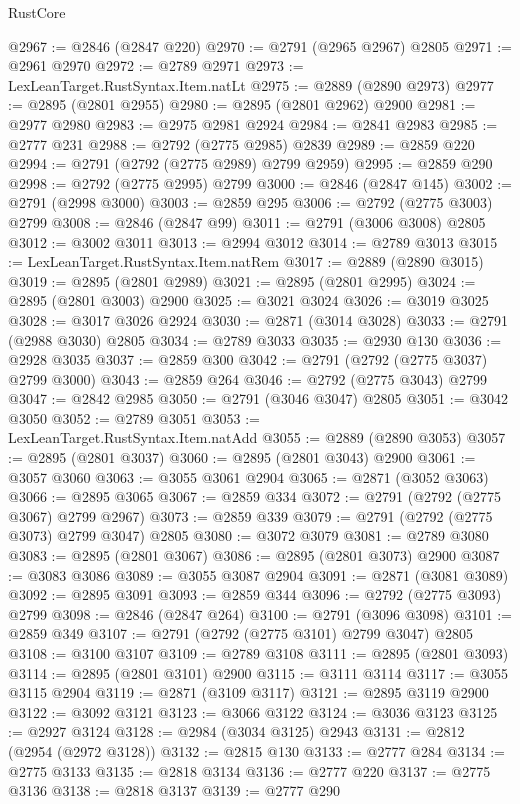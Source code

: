 \begin{lexlean}{RustCore}
\begin{coremodule}
@2967 := @2846 (@2847 @220)
@2970 := @2791 (@2965 @2967) @2805
@2971 := @2961 @2970
@2972 := @2789 @2971
@2973 := LexLeanTarget.RustSyntax.Item.natLt
@2975 := @2889 (@2890 @2973)
@2977 := @2895 (@2801 @2955)
@2980 := @2895 (@2801 @2962) @2900
@2981 := @2977 @2980
@2983 := @2975 @2981 @2924
@2984 := @2841 @2983
@2985 := @2777 @231
@2988 := @2792 (@2775 @2985) @2839
@2989 := @2859 @220
@2994 := @2791 (@2792 (@2775 @2989) @2799 @2959)
@2995 := @2859 @290
@2998 := @2792 (@2775 @2995) @2799
@3000 := @2846 (@2847 @145)
@3002 := @2791 (@2998 @3000)
@3003 := @2859 @295
@3006 := @2792 (@2775 @3003) @2799
@3008 := @2846 (@2847 @99)
@3011 := @2791 (@3006 @3008) @2805
@3012 := @3002 @3011
@3013 := @2994 @3012
@3014 := @2789 @3013
@3015 := LexLeanTarget.RustSyntax.Item.natRem
@3017 := @2889 (@2890 @3015)
@3019 := @2895 (@2801 @2989)
@3021 := @2895 (@2801 @2995)
@3024 := @2895 (@2801 @3003) @2900
@3025 := @3021 @3024
@3026 := @3019 @3025
@3028 := @3017 @3026 @2924
@3030 := @2871 (@3014 @3028)
@3033 := @2791 (@2988 @3030) @2805
@3034 := @2789 @3033
@3035 := @2930 @130
@3036 := @2928 @3035
@3037 := @2859 @300
@3042 := @2791 (@2792 (@2775 @3037) @2799 @3000)
@3043 := @2859 @264
@3046 := @2792 (@2775 @3043) @2799
@3047 := @2842 @2985
@3050 := @2791 (@3046 @3047) @2805
@3051 := @3042 @3050
@3052 := @2789 @3051
@3053 := LexLeanTarget.RustSyntax.Item.natAdd
@3055 := @2889 (@2890 @3053)
@3057 := @2895 (@2801 @3037)
@3060 := @2895 (@2801 @3043) @2900
@3061 := @3057 @3060
@3063 := @3055 @3061 @2904
@3065 := @2871 (@3052 @3063)
@3066 := @2895 @3065
@3067 := @2859 @334
@3072 := @2791 (@2792 (@2775 @3067) @2799 @2967)
@3073 := @2859 @339
@3079 := @2791 (@2792 (@2775 @3073) @2799 @3047) @2805
@3080 := @3072 @3079
@3081 := @2789 @3080
@3083 := @2895 (@2801 @3067)
@3086 := @2895 (@2801 @3073) @2900
@3087 := @3083 @3086
@3089 := @3055 @3087 @2904
@3091 := @2871 (@3081 @3089)
@3092 := @2895 @3091
@3093 := @2859 @344
@3096 := @2792 (@2775 @3093) @2799
@3098 := @2846 (@2847 @264)
@3100 := @2791 (@3096 @3098)
@3101 := @2859 @349
@3107 := @2791 (@2792 (@2775 @3101) @2799 @3047) @2805
@3108 := @3100 @3107
@3109 := @2789 @3108
@3111 := @2895 (@2801 @3093)
@3114 := @2895 (@2801 @3101) @2900
@3115 := @3111 @3114
@3117 := @3055 @3115 @2904
@3119 := @2871 (@3109 @3117)
@3121 := @2895 @3119 @2900
@3122 := @3092 @3121
@3123 := @3066 @3122
@3124 := @3036 @3123
@3125 := @2927 @3124
@3128 := @2984 (@3034 @3125) @2943
@3131 := @2812 (@2954 (@2972 @3128))
@3132 := @2815 @130
@3133 := @2777 @284
@3134 := @2775 @3133
@3135 := @2818 @3134
@3136 := @2777 @220
@3137 := @2775 @3136
@3138 := @2818 @3137
@3139 := @2777 @290

\end{coremodule}
\end{lexlean}

